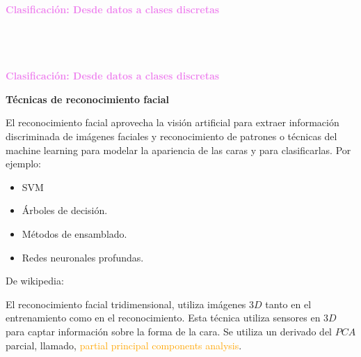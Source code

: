 \documentclass[11pt]{beamer}
\begin{document}
\begin{frame}{\textbf{\textcolor{violet}{Clasificaci\'on: Desde datos a clases discretas}} }
{\begin{columns}
\begin{column}{0.25\textwidth}
 	\end{column}
 	​  \end{columns}
	
}
\end{frame}
\begin{frame}{\textbf{\textcolor{violet}{Clasificaci\'on: Desde datos a clases discretas}} }
	\vspace{0.2cm}
	
	\textbf{T\'ecnicas de reconocimiento facial}
	
	\scriptsize{ El reconocimiento facial aprovecha la visi\'on artificial para extraer informaci\'on discriminada de im\'agenes faciales y reconocimiento de patrones o t\'ecnicas del machine learning para modelar la apariencia de las caras y para clasificarlas. Por ejemplo:
		
	
		
	\begin{itemize}
		\item SVM
		\item \'Arboles de decisi\'on.
		\item M\'etodos de ensamblado.
		\item Redes neuronales profundas.
	\end{itemize}
	
De wikipedia:

El reconocimiento facial tridimensional, utiliza im\'agenes $3D$ tanto en el entrenamiento como en el reconocimiento. Esta t\'ecnica utiliza sensores en $3D$ para captar informaci\'on sobre la forma de la cara. Se utiliza un derivado del $PCA$ parcial, llamado, \textcolor{orange}{partial principal components analysis}.
}

\end{frame}
\end{document}
